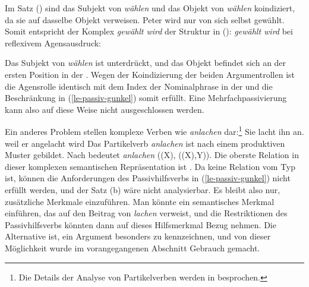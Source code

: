 {Im Satz () sind das Subjekt von \emph{wählen} und das Objekt von \emph{wählen}
koindiziert, da sie auf dasselbe Objekt verweisen.
\ea
Peter wird nur von sich selbst gewählt.
\z
Somit entspricht der Komplex \emph{gewählt wird} der Struktur in ():
\eas
\emph{gewählt wird} bei reflexivem Agensausdruck:\\
\zs

\noindent
Das Subjekt von \emph{wählen} ist unterdrückt, und das Objekt befindet sich an der ersten
Position in der \compsl. Wegen der Koindizierung der beiden Argumentrollen ist die
Agensrolle identisch mit dem Index der Nominalphrase in der \compsl und die Beschränkung
in (\ref{le-passiv-gunkel}) somit erfüllt. Eine Mehrfachpassivierung kann also auf diese Weise
nicht ausgeschlossen werden.

Ein anderes Problem stellen komplexe Verben wie \emph{anlachen} dar:\footnote{Die Details
der Analyse von Partikelverben werden in  besprochen.}
\eal
\ex Sie lacht ihn an.
\ex weil er angelacht wird
\zl
Das Partikelverb \emph{anlachen} ist nach einem produktiven Muster gebildet. Nach
 bedeutet \emph{anlachen} ((X), ((X),Y)).
Die oberste Relation in dieser komplexen semantischen Repräsentation ist .
Da  keine Relation vom Typ  ist, können die Anforderungen
des Passivhilfsverbs in (\ref{le-passiv-gunkel}) nicht erfüllt werden, und der
Satz (b) wäre nicht analysierbar. Es bleibt also nur, zusätzliche Merkmale einzuführen.
Man könnte ein semantisches Merkmal einführen, das
auf den Beitrag von \emph{lachen} verweist, und die Restriktionen des Passivhilfsverbs
könnten dann auf dieses Hilfsmerkmal Bezug nehmen. Die Alternative ist, ein Argument
besonders zu kennzeichnen, und von dieser Möglichkeit wurde im vorangegangenen Abschnitt
Gebrauch gemacht.

%
%



}
